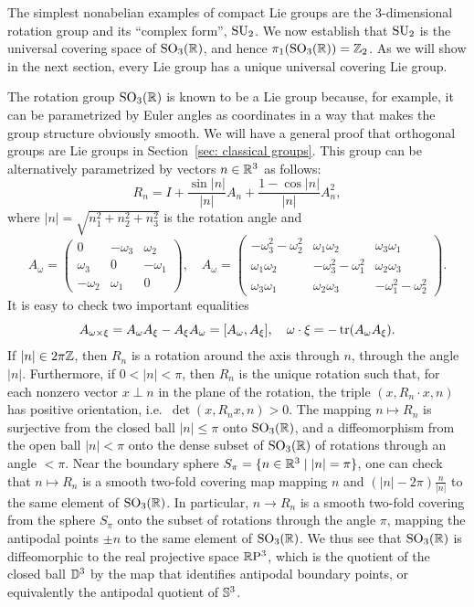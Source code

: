 The simplest nonabelian examples of compact Lie groups are the 3-dimensional rotation group and its ``complex form'', $\operatorname{SU}_2$. We now establish that $\operatorname{SU}_2$ is the universal covering space of $\operatorname{SO}_3(\mathbb{R})$, and hence $\pi_1(\operatorname{SO}_3(\mathbb{R}))=\mathbb{Z}_2$. As we will show in the next section, every Lie group has a unique universal covering Lie group.

\begin{example}\label{example su2 and so3}
    The rotation group $\operatorname{SO}_3(\mathbb{R})$ is known to be a Lie group because, for example, it can be parametrized by Euler angles as coordinates in a way that makes the group structure obviously smooth. We will have a general proof that orthogonal groups are Lie groups in Section~\ref{sec: classical groups}. This group can be alternatively parametrized by vectors $n\in\mathbb{R}^3$ as follows:
    \[R_n=I+\frac{\sin |n|}{|n|}A_n+\frac{1-\cos |n|}{|n|}A_n^2,\]
    where $|n|=\sqrt{n_1^2+n_2^2+n_3^2}$ is the rotation angle and 
    \[A_\omega=\begin{pmatrix}
        0&-\omega_3&\omega_2\\
        \omega_3&0&-\omega_1\\
        -\omega_2&\omega_1&0
    \end{pmatrix},\quad 
    A_\omega=\begin{pmatrix}
        -\omega_3^2-\omega_2^2 &\omega_1\omega_2 &\omega_3\omega_1\\
        \omega_1\omega_2& -\omega_3^2-\omega_1^2 & \omega_2\omega_3\\
        \omega_3\omega_1 & \omega_2\omega_3 & -\omega_1^2-\omega_2^2
    \end{pmatrix}
    .\]
    It is easy to check two important equalities 
    \[A_{\omega\times \xi}=A_\omega A_\xi-A_\xi A_\omega=[A_\omega,A_\xi],\quad \omega\cdot\xi=-\operatorname{tr}(A_\omega A_\xi).\label{eq R3->so(3) hom}\]
    If $|n|\in 2\pi\mathbb{Z}$, then $R_n$ is a rotation around the axis through $n$, through the angle $|n|$. Furthermore, if $0<|n|<\pi$, then $R_n$ is the unique rotation such that, for each nonzero vector $x\perp n$ in the plane of the rotation, the triple $(x,R_n\cdot x,n)$ has positive orientation, i.e.~$\det (x,R_n x,n)>0$. The mapping $n\mapsto R_n$ is surjective from the closed ball $|n|\leq \pi$ onto $\operatorname{SO}_3(\mathbb{R})$, and a diffeomorphism from the open ball $|n|<\pi$ onto the dense subset of $\operatorname{SO}_3(\mathbb{R})$ of rotations through an angle $<\pi$. Near the boundary sphere $S_\pi=\{n\in\mathbb{R}^3\mid |n|=\pi\}$, one can check that $n\mapsto R_n$ is a smooth two-fold covering map mapping $n$ and $(|n|-2\pi)\frac{n}{|n|}$ to the same element of $\operatorname{SO}_3(\mathbb{R})$. In particular, $n\to R_n$ is a smooth two-fold covering from the sphere $S_\pi$ onto the subset of rotations through the angle $\pi$, mapping the antipodal points $\pm n$ to the same element of $\operatorname{SO}_3(\mathbb{R})$. We thus see that $\operatorname{SO}_3(\mathbb{R})$ is diffeomorphic to the real projective space $\mathbb{R}\mathrm{P}^3$, which is the quotient of the closed ball $\mathbb{D}^3$ by the map that identifies antipodal boundary points, or equivalently the antipodal quotient of $\mathbb{S}^3$.
    

\end{example}
